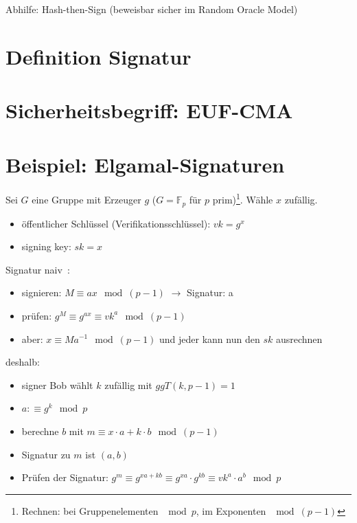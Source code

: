\documentclass[a4paper,twoside,DIV15,BCOR12mm]{scrbook}
\begin{document}
Abhilfe: Hash-then-Sign (beweisbar sicher im Random Oracle Model)

\section{Definition Signatur}


\section{Sicherheitsbegriff: EUF-CMA}

\section{Beispiel: Elgamal-Signaturen}

Sei $G$ eine Gruppe mit Erzeuger $g$ ($G = \mathbb{F}_p$ für $p$ prim)\footnote{Rechnen: bei Gruppenelementen $\mod{p}$, im Exponenten $\mod{(p-1)}$}. Wähle $x$ zufällig.

\begin{itemize}
	\item öffentlicher Schlüssel (Verifikationsschlüssel): $vk = g^x$
	\item signing key: $sk = x$
\end{itemize}

Signatur \glqq naiv\grqq\ :

\begin{itemize}
	\item signieren: $M \equiv ax \mod{(p-1)}$ $\rightarrow$ Signatur: a
	\item prüfen: $g^M \equiv g^{ax} \equiv {vk}^a \mod{(p-1)}$
	\item aber: $x \equiv Ma^{-1} \mod{(p-1)}$ und jeder kann nun den $sk$ ausrechnen
\end{itemize}

deshalb:

\begin{itemize}
	\item signer Bob wählt $k$ zufällig mit $ggT(k, p-1) = 1$
	\item $ a :\equiv g^k \mod{p}$
	\item berechne $b$ mit $m \equiv x \cdot a + k \cdot b \mod{(p-1)}$
	\item Signatur zu $m$ ist $(a,b)$
	\item Prüfen der Signatur: $g^m \equiv g^{xa+kb} \equiv g^{xa} \cdot g^{kb} \equiv {vk}^a \cdot a^b \mod{p}$
\end{itemize}
\end{document}
